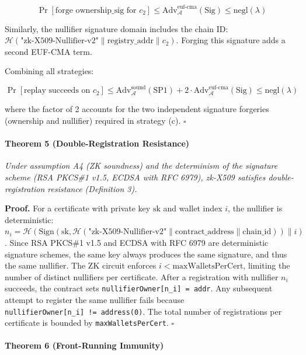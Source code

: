 \documentclass[11pt, a4paper]{article}
\begin{document}
\[\Pr[\text{forge ownership\_sig for } c_2] \leq \text{Adv}_{\mathcal{A}}^{\text{euf-cma}}(\text{Sig}) \leq \text{negl}(\lambda)\]

Similarly, the nullifier signature domain includes the chain ID:
\(\mathcal{H}(\text{"zk-X509-Nullifier-v2"} \| \text{registry\_addr} \| c_2)\).
Forging this signature adds a second EUF-CMA term.

Combining all strategies:

\[\Pr[\text{replay succeeds on } c_2] \leq \text{Adv}_{\mathcal{A}}^{\text{sound}}(\text{SP1}) + 2 \cdot \text{Adv}_{\mathcal{A}}^{\text{euf-cma}}(\text{Sig}) \leq \text{negl}(\lambda)\]

where the factor of 2 accounts for the two independent signature
forgeries (ownership and nullifier) required in strategy (c).
\(\square\)

\paragraph{Theorem 5 (Double-Registration
Resistance)}\label{theorem-3-double-registration-resistance}

\emph{Under assumption A4 (ZK soundness) and the determinism of the signature scheme (RSA PKCS\#1 v1.5, ECDSA with RFC 6979),
zk-X509 satisfies double-registration resistance (Definition 3).}

\textbf{Proof.} For a certificate with private key \(\text{sk}\) and
wallet index \(i\), the nullifier is deterministic:
\(n_i = \mathcal{H}(\text{Sign}(\text{sk}, \mathcal{H}(\text{"zk-X509-Nullifier-v2"} \| \text{contract\_address} \| \text{chain\_id})) \| i)\).
Since RSA PKCS\#1 v1.5 and ECDSA with RFC 6979 are deterministic
signature schemes, the same key always produces the same signature, and
thus the same nullifier. The ZK circuit enforces
\(i < \text{maxWalletsPerCert}\), limiting the number of distinct
nullifiers per certificate. After a registration with nullifier \(n_i\)
succeeds, the contract sets \texttt{nullifierOwner{[}n\_i{]}\ =\ addr}.
Any subsequent attempt to register the same nullifier fails because
\texttt{nullifierOwner{[}n\_i{]}\ !=\ address(0)}. The total number of
registrations per certificate is bounded by \texttt{maxWalletsPerCert}.
\(\square\)

\paragraph{Theorem 6 (Front-Running
Immunity)}\label{theorem-6-front-running-immunity}
\end{document}
